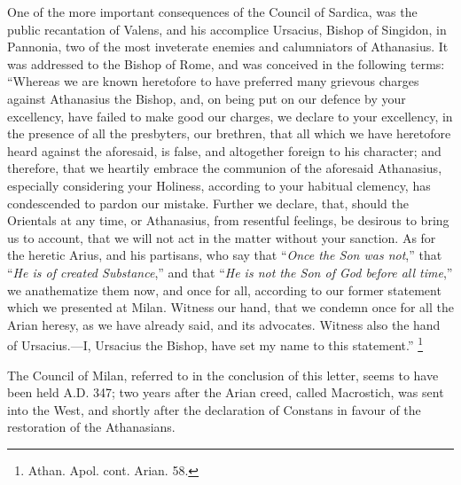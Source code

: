 One of the more important consequences of the Council of Sardica,
was the public recantation of Valens, and his accomplice Ursacius,
Bishop of Singidon, in Pannonia, two of the most inveterate enemies
and calumniators of Athanasius. It was addressed to the Bishop of
Rome, and was conceived in the following terms: ``Whereas we are
known heretofore to have preferred many grievous charges against
Athanasius the Bishop, and, on being put on our defence by your
excellency, have failed to make good our charges, we declare to your
excellency, in the presence of all the presbyters, our brethren, that
all which we have heretofore heard against the aforesaid, is false,
and altogether foreign to his character; and therefore, that we
heartily embrace the communion of the aforesaid Athanasius, especially
considering your Holiness, according to your habitual clemency, has
condescended to pardon our mistake. Further we declare, that, should
the Orientals at any time, or Athanasius, from resentful feelings, be
desirous to bring us to account, that we will not act in the matter
without your sanction. As for the heretic Arius, and his partisans,
who say that ``\emph{Once the Son was not},'' that ``\emph{He
is of created Substance},'' and that ``\emph{He is not the Son
of God before all time},'' we anathematize them now, and once
for all, according to our former statement which we presented at
Milan. Witness our hand, that we condemn once for all the Arian
heresy, as we have already said, and its advocates. Witness also the
hand of Ursacius.—I, Ursacius the Bishop, have set my name to this
statement.'' \footnote{Athan. Apol. cont. Arian. 58.}

The Council of Milan, referred to in the conclusion of this letter,
seems to have been held A.D. 347; two years
after the Arian creed, called Macrostich, was sent into the West, and
shortly after the declaration of Constans in favour of the restoration
of the Athanasians.


